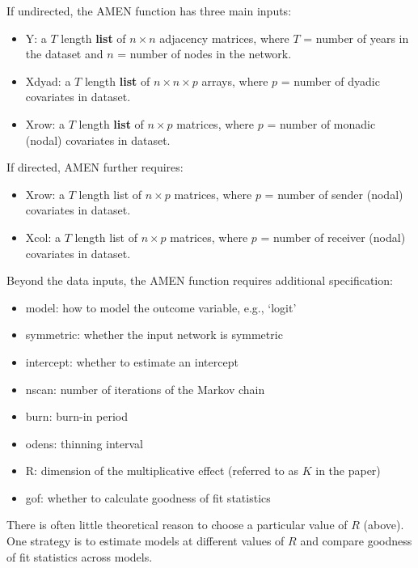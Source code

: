 If undirected, the AMEN function has three main inputs:

\begin{itemize}[noitemsep,nolistsep]
    \item Y: a $T$ length \textbf{list} of $n\times n$ adjacency matrices, where $T$ = number of years in the dataset and $n$ = number of nodes in the network.
    \item Xdyad: a $T$ length \textbf{list} of $n\times n\times p$ arrays, where $p$ = number of dyadic covariates in dataset. 
    \item Xrow: a $T$ length \textbf{list} of $n\times p$ matrices, where $p$ = number of monadic (nodal) covariates in dataset. 
\end{itemize}

If directed, AMEN further requires: 

\begin{itemize}[noitemsep,nolistsep]
    \item Xrow: a $T$ length list of $n\times p$ matrices, where $p$ = number of sender (nodal) covariates in dataset. 
    \item Xcol: a $T$ length list of $n\times p$ matrices, where $p$ = number of receiver (nodal) covariates in dataset. 
\end{itemize}

Beyond the data inputs, the AMEN function requires additional specification: 

\begin{itemize}
    \item model: how to model the outcome variable, e.g., `logit'
    \item symmetric: whether the input network is symmetric
    \item intercept: whether to estimate an intercept
    \item nscan: number of iterations of the Markov chain
    \item burn: burn-in period
    \item odens: thinning interval
    \item R: dimension of the multiplicative effect (referred to as $K$ in the paper)
    \item gof: whether to calculate goodness of fit statistics
\end{itemize}

There is often little theoretical reason to choose a particular value of $R$ (above). One strategy is to estimate models at different values of $R$ and compare goodness of fit statistics across models. 

